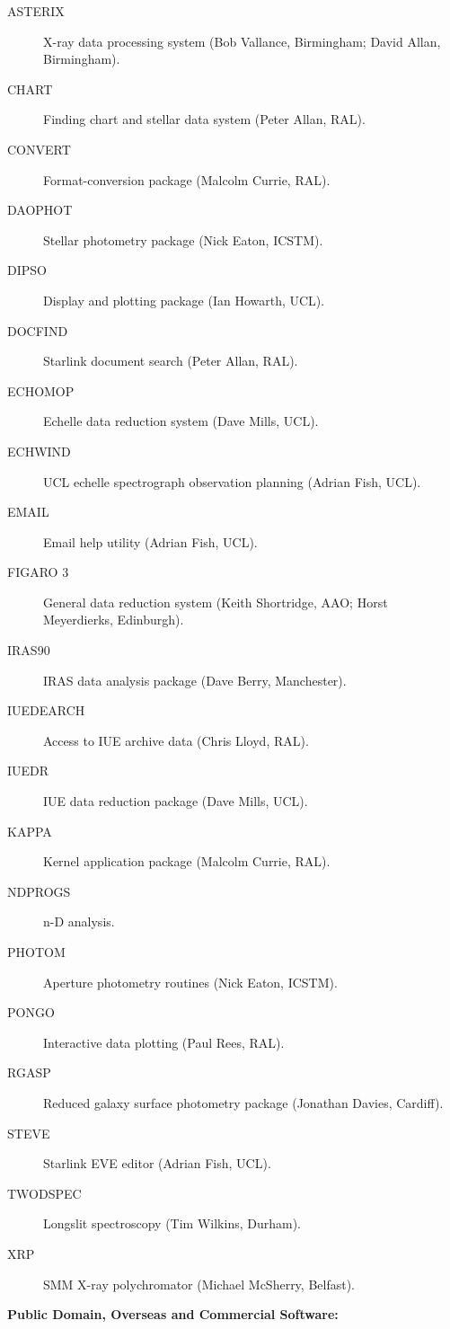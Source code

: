 \begin{description}
\item[ASTERIX] X-ray data processing system (Bob Vallance, Birmingham; 
David Allan, Birmingham).
\item[CHART] Finding chart and stellar data system (Peter Allan, RAL).
\item[CONVERT] Format-conversion package (Malcolm Currie, RAL).
\item[DAOPHOT] Stellar photometry package (Nick Eaton, ICSTM).
\item[DIPSO] Display and plotting package (Ian Howarth, UCL).
\item[DOCFIND] Starlink document search (Peter Allan, RAL).
\item[ECHOMOP] Echelle data reduction system (Dave Mills, UCL).
\item[ECHWIND] UCL echelle spectrograph observation planning (Adrian Fish,
UCL).
\item[EMAIL] Email help utility (Adrian Fish, UCL).
\item[FIGARO 3] General data reduction system (Keith Shortridge, AAO; Horst
Meyerdierks, Edinburgh).
\item[IRAS90] IRAS data analysis package (Dave Berry, Manchester).
\item[IUEDEARCH] Access to IUE archive data (Chris Lloyd, RAL).
\item[IUEDR] IUE data reduction package (Dave Mills, UCL).
\item[KAPPA] Kernel application package (Malcolm Currie, RAL).
\item[NDPROGS] n-D analysis.
\item[PHOTOM] Aperture photometry routines (Nick Eaton, ICSTM).
\item[PONGO] Interactive data plotting (Paul Rees, RAL).
\item[RGASP] Reduced galaxy surface photometry package (Jonathan Davies, 
Cardiff).
\item[STEVE] Starlink EVE editor (Adrian Fish, UCL).
\item[TWODSPEC] Longslit spectroscopy (Tim Wilkins, Durham).
\item[XRP] SMM X-ray polychromator (Michael McSherry, Belfast).
\end{description}


\vspace{5mm}
\begin{center}
{\bf Public Domain, Overseas and Commercial Software:}
\end{center}

